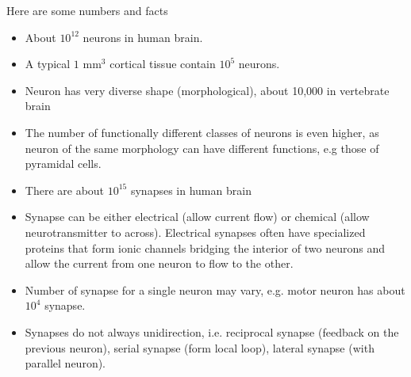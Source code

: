 Here are some numbers and facts
\begin{itemize}
\item About $10^{12}$ neurons in human brain.
\item A typical $1$ mm$^3$ cortical tissue contain $10^5$ neurons. 
\item Neuron has very diverse shape (morphological), about 10,000 in
  vertebrate brain
\item The number of functionally different classes of neurons is even
  higher, as neuron of the same morphology can have different
  functions, e.g those of pyramidal cells. 
\item There are about $10^{15}$ synapses in human brain
\item Synapse can be either electrical (allow current flow) or
  chemical (allow neurotransmitter to across). Electrical synapses
  often have specialized proteins that form ionic channels bridging
  the interior of two neurons and allow the current from one neuron to
  flow to the other. 
\item Number of synapse for a single neuron may vary, e.g. motor
  neuron has about $10^4$ synapse. 
\item Synapses do not always unidirection, i.e. reciprocal synapse
  (feedback on the previous neuron), serial synapse (form local loop),
  lateral synapse (with parallel neuron). 
\end{itemize}

